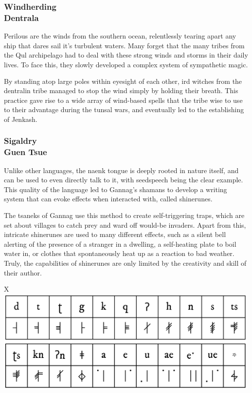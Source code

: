 \begin{linenumbers}

\subsubsection{Windherding\\ \small{Dentrala}} %
Perilous are the winds from the southern ocean, relentlessly tearing apart any ship that dares sail it's turbulent waters.
Many forget that the many tribes from the Qul archipelago had to deal with these strong winds and storms in their daily lives.
To face this, they slowly developed a complex system of sympathetic magic.

By standing atop large poles within eyesight of each other, ird witches from the dentralin tribe managed to stop the wind simply by holding their breath.
This practice gave rise to a wide array of wind-based spells that the tribe wise to use to their advantage during the tunsal wars, and eventually led to the establishing of Jenkash.

\subsubsection{Sigaldry\\ \small{Guen Tsue}} %
Unlike other languages, the naenk tongue is deeply rooted in nature itself, and can be used to even directly talk to it, with seedspeech being the clear example.
This quality of the language led to Gannag's shamans to develop a writing system that can evoke effects when interacted with, called shinerunes.

The tsaneks of Gannag use this method to create self-triggering traps, which are set about villages to catch prey and ward off would-be invaders.
Apart from this, intricate shinerunes are used to many different effects, such as a silent bell alerting of the presence of a stranger in a dwelling, a self-heating plate to boil water in, or clothes that spontaneously heat up as a reaction to bad weather.
Truly, the capabilities of shinerunes are only limited by the creativity and skill of their author.

\begin{table}[t]%
    \begin{DndTable}[width=\linewidth, header=\centering Knaenese Alphabet]{X}
        \centering
        \includegraphics[width=0.99\textwidth]{01intro/img/23knaenese_sample.png}
    \end{DndTable}
\end{table}


\end{linenumbers}
